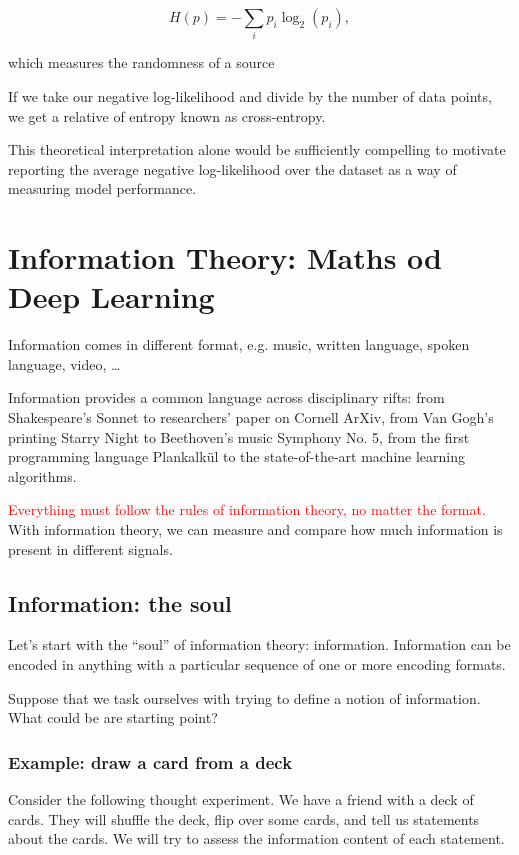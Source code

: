 $$
H(p) = -\sum_{i} p_i \log_2(p_i),
$$

which measures the randomness of a source

If we take our negative log-likelihood and divide by the number of data points,
we get a relative of entropy known as cross-entropy.


This theoretical interpretation alone would be sufficiently compelling to
motivate reporting the average negative log-likelihood over the dataset as a way
of measuring model performance.

\chapter{Information Theory: Maths od Deep Learning}

Information comes in different format, e.g. music, written language, spoken
language, video, \ldots

Information provides a common language across disciplinary rifts: from
Shakespeare’s Sonnet to researchers’ paper on Cornell ArXiv, from Van Gogh’s
printing Starry Night to Beethoven’s music Symphony No. 5, from the first
programming language Plankalkül to the state-of-the-art machine learning
algorithms. 

\textcolor{red}{Everything must follow the rules of information theory, no matter the format.}
With information theory, we can measure and compare how much information is
present in different signals.

\section{Information: the soul}

Let’s start with the “soul” of information theory: information. Information can
be encoded in anything with a particular sequence of one or more encoding
formats.

Suppose that we task ourselves with trying to define a notion of information.
What could be are starting point?

\subsection{Example: draw a card from a deck}

Consider the following thought experiment. We have a friend with a deck of
cards. They will shuffle the deck, flip over some cards, and tell us statements
about the cards. We will try to assess the information content of each
statement.

